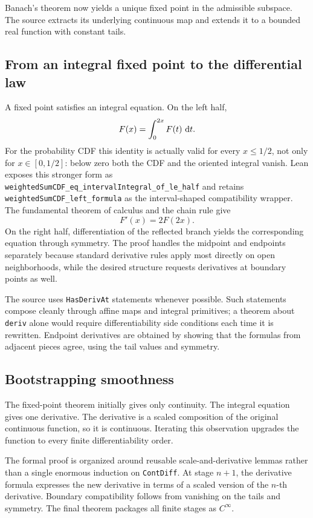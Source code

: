 \documentclass[11pt,oneside]{article}
\theoremstyle{definition}
\theoremstyle{remark}
\begin{document}
Banach's theorem now yields a unique fixed point in the admissible subspace.  The source extracts its underlying continuous map and extends it to a bounded real function with constant tails.

\subsection{From an integral fixed point to the differential law}
A fixed point satisfies an integral equation.  On the left half,
\[
  F(x)=\int_0^{2x}F(t)\,\mathop{}\!\mathrm{d} t.
\]
For the probability CDF this identity is actually valid for every
$x\leq1/2$, not only for $x\in[0,1/2]$: below zero both the CDF and the
oriented integral vanish.  Lean exposes this stronger form as
\nolinkurl{weightedSumCDF_eq_intervalIntegral_of_le_half} and retains
\nolinkurl{weightedSumCDF_left_formula} as the interval-shaped compatibility
wrapper.
The fundamental theorem of calculus and the chain rule give
\[
  F'(x)=2F(2x).
\]
On the right half, differentiation of the reflected branch yields the corresponding equation through symmetry.  The proof handles the midpoint and endpoints separately because standard derivative rules apply most directly on open neighborhoods, while the desired structure requests derivatives at boundary points as well.

The source uses \nolinkurl{HasDerivAt} statements whenever possible.  Such statements compose cleanly through affine maps and integral primitives; a theorem about \nolinkurl{deriv} alone would require differentiability side conditions each time it is rewritten.  Endpoint derivatives are obtained by showing that the formulas from adjacent pieces agree, using the tail values and symmetry.

\subsection{Bootstrapping smoothness}
The fixed-point theorem initially gives only continuity.  The integral equation gives one derivative.  The derivative is a scaled composition of the original continuous function, so it is continuous.  Iterating this observation upgrades the function to every finite differentiability order.

The formal proof is organized around reusable scale-and-derivative lemmas rather than a single enormous induction on \nolinkurl{ContDiff}.  At stage \(n+1\), the derivative formula expresses the new derivative in terms of a scaled version of the \(n\)-th derivative.  Boundary compatibility follows from vanishing on the tails and symmetry.  The final theorem packages all finite stages as \(C^\infty\).
\end{document}
